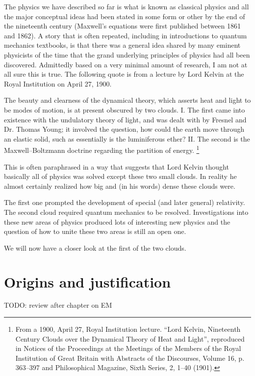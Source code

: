 The physics we have described so far is what is known as classical physics and all the major conceptual ideas had been stated in some form or other by the end of the nineteenth century (Maxwell's equations were first published between 1861 and 1862). A story that is often repeated, including in introductions to quantum mechanics textbooks, is that there was a general idea shared by many eminent physicists of the time that the grand underlying principles of physics had all been discovered. Admittedly based on a very minimal amount of research, I am not at all sure this is true. The following quote is from a lecture by Lord Kelvin at the Royal Institution on April 27, 1900.

\begin{displayquote}
The beauty and clearness of the dynamical theory, which asserts heat and light to be modes of motion, is at present obscured by two clouds. I. The first came into existence with the undulatory theory of light, and was dealt with by Fresnel and Dr. Thomas Young; it involved the question, how could the earth move through an elastic solid, such as essentially is the luminiferous ether? II. The second is the Maxwell–Boltzmann doctrine regarding the partition of energy.
\footnote{From a 1900, April 27, Royal Institution lecture. “Lord Kelvin, Nineteenth Century Clouds over the Dynamical Theory of Heat and Light”, reproduced in Notices of the Proceedings at the Meetings of the Members of the Royal Institution of Great Britain with Abstracts of the Discourses, Volume 16, p. 363–397 and Philosophical Magazine, Sixth Series, 2, 1–40 (1901).}
\end{displayquote}
This is often paraphrased in a way that suggests that Lord Kelvin thought basically all of physics was solved except these two small clouds. In reality he almost certainly realized how big and (in his words) dense these clouds were.

The first one prompted the development of special (and later general) relativity. The second cloud required quantum mechanics to be resolved. Investigations into these new areas of physics produced lots of interesting new physics and the question of how to unite these two areas is still an open one.

We will now have a closer look at the first of the two clouds.

\chapter{Origins and justification}
TODO: review after chapter on EM

